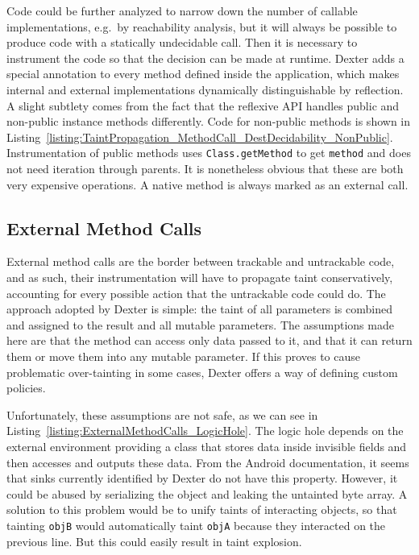 \documentclass[12pt,twoside,notitlepage]{report}
\begin{document}
Code could be further analyzed to narrow down the number of callable implementations, e.g.\ by reachability analysis, but it will always be possible to produce code with a statically undecidable call. Then it is necessary to instrument the code so that the decision can be made at runtime. Dexter adds a special annotation to every method defined inside the application, which makes internal and external implementations dynamically distinguishable by reflection. A slight subtlety comes from the fact that the reflexive API handles public and non-public instance methods differently. Code for non-public methods is shown in Listing~\ref{listing:TaintPropagation_MethodCall_DestDecidability_NonPublic}. Instrumentation of public methods uses \verb$Class.getMethod$ to get \verb$method$ and does not need iteration through parents. It is nonetheless obvious that these are both very expensive operations. A native method is always marked as an external call.

\subsection{External Method Calls}
\label{section:TaintPropagation_MethodCalls_External}

External method calls are the border between trackable and untrackable code, and as such, their instrumentation will have to propagate taint conservatively, accounting for every possible action that the untrackable code could do. The approach adopted by Dexter is simple: the taint of all parameters is combined and assigned to the result and all mutable parameters. The assumptions made here are that the method can access only data passed to it, and that it can return them or move them into any mutable parameter. If this proves to cause problematic over-tainting in some cases, Dexter offers a way of defining custom policies.

Unfortunately, these assumptions are not safe, as we can see in Listing~\ref{listing:ExternalMethodCalls_LogicHole}. The logic hole depends on the external environment providing a class that stores data inside invisible fields and then accesses and outputs these data. From the Android documentation, it seems that sinks currently identified by Dexter do not have this property. However, it could be abused by serializing the object and leaking the untainted byte array. A solution to this problem would be to unify taints of interacting objects, so that tainting \verb$objB$ would automatically taint \verb$objA$ because they interacted on the previous line. But this could easily result in taint explosion.
\end{document}
